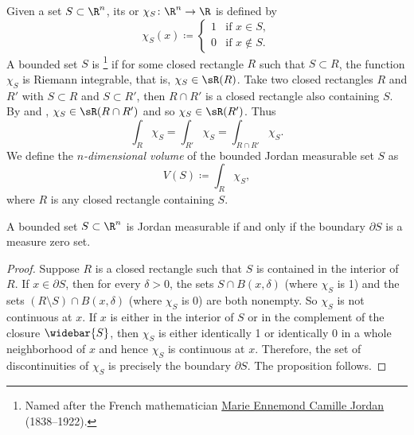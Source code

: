 Given a set
$S \subset \R^n$, its \emph{}
or \emph{} $\chi_S \colon \R^n \to \R$
is defined by
\begin{equation*}
\chi_S(x) \coloneqq
\begin{cases}
1 & \text{if } x \in S, \\
0 & \text{if } x \notin S.
\end{cases}
\end{equation*}
A bounded set $S$ is \emph{}\footnote{Named after
the French mathematician
\href{https://en.wikipedia.org/wiki/Camille_Jordan}{Marie Ennemond Camille Jordan}
(1838--1922).}
if for some closed rectangle $R$ such that $S \subset R$, the function
$\chi_S$ is Riemann integrable, that is, $\chi_S \in \sR(R)$.
Take two closed rectangles $R$ and $R'$ 
with $S \subset R$ and $S \subset R'$, then $R \cap R'$ is a closed rectangle
also containing $S$.  By 
and , $\chi_S \in \sR(R \cap R')$
and so $\chi_S \in \sR(R')$.  Thus
\begin{equation*}
\int_R \chi_S = \int_{R'} \chi_S = \int_{R \cap R'} \chi_S.
\end{equation*}
We define the
\emph{$n$-dimensional volume}%
%
 of the
bounded Jordan measurable set $S$ as
\begin{equation*}
V(S) \coloneqq \int_R \chi_S ,
\end{equation*}
where $R$ is any closed rectangle containing $S$.

\begin{prop}
A bounded set $S \subset \R^n$ is Jordan measurable if and only if
the boundary $\partial S$ is a measure zero set.
\end{prop}

\begin{proof}
Suppose $R$ is a closed rectangle such that $S$ is
contained in the interior of $R$.
If $x \in \partial S$, then for every $\delta > 0$,
the sets $S \cap B(x,\delta)$ (where $\chi_S$ is 1) and
the sets $(R \setminus S) \cap B(x,\delta)$ (where $\chi_S$ is 0) are
both nonempty.  So $\chi_S$ is not continuous at $x$.
If $x$ is either in the interior of $S$ or in the complement of the closure
$\widebar{S}$, then $\chi_S$ is either identically 1 or identically 0
in a whole neighborhood of $x$ and hence $\chi_S$ is continuous at $x$.
Therefore, the set of discontinuities of $\chi_S$ is precisely the
boundary $\partial S$.  The proposition follows.
\end{proof}

